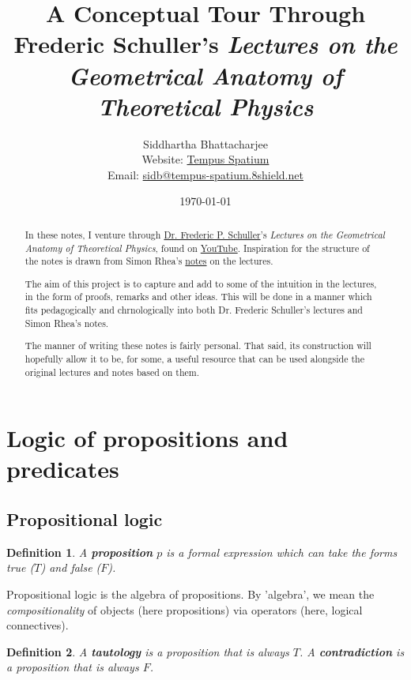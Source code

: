 \documentclass[12pt]{article}
\title{A Conceptual Tour Through Frederic Schuller's \emph{Lectures on the Geometrical Anatomy of Theoretical Physics}}
\author{Siddhartha Bhattacharjee \\
Website: \href{https://booodaness.github.io/tempus-spatium/}{Tempus Spatium} \\
Email: \href{javascript:location.href = 'mailto:' + ['sidb','tempus-spatium.8shield.net'].join('@')}{sidb@tempus-spatium.8shield.net}
}
\affil{Student, B.Sc. (Hons) Mathematical Physics, University of Waterloo}
\date{\today}
\newtheorem{definition}{Definition}[section]
\begin{document}
\maketitle

\begin{abstract}
In these notes, I venture through \href{https://people.utwente.nl/f.p.schuller}{Dr. Frederic P. Schuller}'s \emph{Lectures on the Geometrical Anatomy of Theoretical Physics}, found on \href{https://youtube.com/playlist?list=PLPH7f_7ZlzxTi6kS4vCmv4ZKm9u8g5yic}{YouTube}. Inspiration for the structure of the notes is drawn from Simon Rhea's \href{https://mathswithphysics.blogspot.com/2016/07/lectures-on-geometric-anatomy-of.html}{notes} on the lectures.

The aim of this project is to capture and add to some of the intuition in the lectures, in the form of proofs, remarks and other ideas. This will be done in a manner which fits pedagogically and chrnologically into both Dr. Frederic Schuller's lectures and Simon Rhea's notes.

The manner of writing these notes is fairly personal. That said, its construction will hopefully allow it to be, for some, a useful resource that can be used alongside the original lectures and notes based on them.
\end{abstract}

\tableofcontents

\section{Logic of propositions and predicates}

\subsection{Propositional logic}

\begin{shaded}
\begin{definition}
A \textbf{proposition} $p$ is a formal expression which can take the forms \emph{true} ($T$) and \emph{false} ($F$).
\end{definition}
\end{shaded}

Propositional logic is the algebra of propositions. By 'algebra', we mean the \emph{compositionality} of objects (here propositions) via operators (here, logical connectives).

\begin{definition}
A \textbf{tautology} is a proposition that is always $T$. A \textbf{contradiction} is a proposition that is always $F$.
\end{definition}
\end{document}
